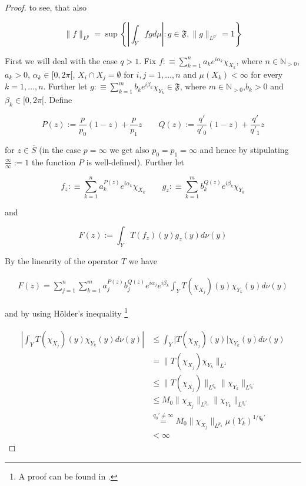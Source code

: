 \begin{proof}
	to see, that also

	\begin{equation*}
		\|f\|_{L^p} = \sup \left\{ \left\vert \int_Y fgd\mu\right\vert : g \in \mathfrak{F},\|g\|_{L^{p'}} = 1\right\}
	\end{equation*}

	First we will deal with the case \underline{$q > 1$}. Fix $f :\equiv \sum_{k = 1}^n a_k e^{i\alpha_k}\chi_{X_k}$, where $n \in \mathbb{N}_{>0}$,$a_k > 0$, $\alpha_k \in [0,2\pi[$, $X_i \cap X_j = \emptyset$ for $i,j = 1,\hdots,n$ and $\mu(X_k) < \infty$ for every $k = 1,\hdots,n$. Further let $g :\equiv \sum_{k = 1}^m b_k e^{i\beta_k}\chi_{Y_k} \in \mathfrak{F}$, where $m \in \mathbb{N}_{>0}$,$b_k > 0$ and $\beta_k \in [0,2\pi[$. Define

				\begin{equation*}
					P(z) := \frac{p}{p_0}(1 - z) + \frac{p}{p_1}z \qquad Q(z) := \frac{q'}{q'_0}(1 - z) + \frac{q'}{q'_1}z
				\end{equation*}

				for $z \in \overline{S}$ (in the case $p = \infty$ we get also $p_0 = p_1 = \infty$ and hence by stipulating $\frac{\infty}{\infty}:= 1$ the function $P$ is well-defined). Further let
				
				\begin{equation}
					f_z :\equiv \sum_{k = 1}^n a^{P(z)}_k e^{i\alpha_k}\chi_{X_k} \qquad g_z :\equiv  \sum_{k = 1}^m b^{Q(z)}_k e^{i\beta_k}\chi_{Y_k}
					\label{def:fzgz}
				\end{equation}
				
				and 

				\begin{equation}
					F(z) := \int_Y T(f_z)(y)g_z(y)d\nu(y)
				\end{equation}

				By the linearity of the operator $T$ we have

				\begin{gather}
					F(z) = \sum_{j = 1}^n\sum_{k = 1}^m a^{P(z)}_j b_j^{Q(z)} e^{i\alpha_j} e^{i\beta_k} \int_YT(\chi_{X_j})(y)\chi_{Y_k}(y)d\nu(y) 
					\label{def:F}
				\end{gather}

				and by using H\"older's inequality \footnote{A proof can be found in \cite[223]{elstrodt:mass:2011}.}

				\begin{gather}
					\begin{aligned}
						\left\vert \int_YT(\chi_{X_j})(y)\chi_{Y_k}(y)d\nu(y) \right\vert &\leqslant \int_Y\vert T(\chi_{X_j})(y)\vert \chi_{Y_k}(y)d\nu(y)\\
						&= \|T(\chi_{X_j})\chi_{Y_k}\|_{L^1}\\
						&\leqslant \|T(\chi_{X_j})\|_{L^{q_0}} \|\chi_{Y_k}\|_{L^{q_0'}}\\
						&\leqslant M_0\|\chi_{X_j}\|_{L^{p_0}} \|\chi_{Y_k}\|_{L^{q_0'}}\\
						&\overset{q_0' \neq \infty}{=} M_0\|\chi_{X_j}\|_{L^{p_0}} \mu(Y_k)^{1/q_0'}\\ 
						&< \infty
					\end{aligned}
				\end{gather}


\end{proof}
